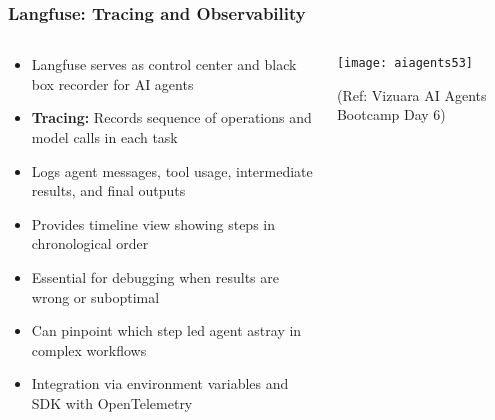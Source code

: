 \begin{frame}[fragile]\frametitle{Langfuse: Tracing and Observability}
\begin{columns}
    \begin{column}[T]{0.6\linewidth}
      \begin{itemize}
		\item Langfuse serves as control center and black box recorder for AI agents
		\item \textbf{Tracing:} Records sequence of operations and model calls in each task
		\item Logs agent messages, tool usage, intermediate results, and final outputs
		\item Provides timeline view showing steps in chronological order
		\item Essential for debugging when results are wrong or suboptimal
		\item Can pinpoint which step led agent astray in complex workflows
		\item Integration via environment variables and SDK with OpenTelemetry
	  \end{itemize}
    \end{column}
    \begin{column}[T]{0.4\linewidth}
		\begin{center}
		\texttt{[image: aiagents53]}
		
		{\tiny (Ref: Vizuara AI Agents Bootcamp Day 6)}
		\end{center}	
    \end{column}
  \end{columns}
\end{frame}

